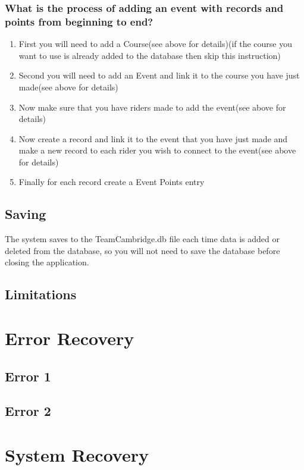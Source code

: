 \subsubsection{What is the process of adding an event with records and points from beginning to end?}
\begin{enumerate}
\item First you will need to add a Course(see above for details)(if the course you want to use is already added to the database then skip this instruction)
\item Second you will need to add an Event and link it to the course you have just made(see above for details)
\item Now make sure that you have riders made to add the event(see above for details)
\item Now create a record and link it to the event that you have just made and make a new record to each rider you wish to connect to the  event(see above for details)
\item Finally for each record create a Event Points entry
\end{enumerate}

\subsection{Saving}
The system saves to the TeamCambridge.db file each time data is added or deleted from the database, so you will not need to save the database before closing the application.
\subsection{Limitations}

\section{Error Recovery}

\subsection{Error 1}

\subsection{Error 2}

\section{System Recovery}

